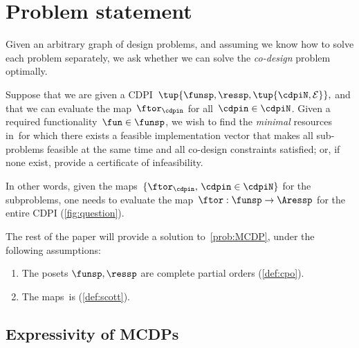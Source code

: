 

\section{Problem statement}
\label{sec:Optimization}

Given an arbitrary graph of design problems, and assuming we know
how to solve each problem separately, we ask whether we can solve
the \emph{co-design} problem optimally.







\begin{problem}
  \label{prob:MCDP}Suppose that we are given a CDPI~$\tup{ \funsp,\ressp,\tup{ \cdpiN,\mathcal{E}} } ,$
  and that we can evaluate the map~$\ftor_{\cdpin}$ for all~$\cdpin\in\cdpiN$.
  Given a required functionality~$\fun\in\funsp$, we wish to find
  the \emph{minimal} resources in~\ressp for which there exists
  a feasible implementation vector that makes all sub-problems feasible
  at the same time and all co-design constraints satisfied; or, if
  none exist, provide a certificate of infeasibility.
\end{problem}
In other words, given the maps~$\{\ftor_{\cdpin},\,\cdpin\in\cdpiN\}$
for the subproblems, one needs to evaluate the map~$\ftor:\funsp\rightarrow\Aressp$
for the entire CDPI (\cref{fig:question}).


The rest of the paper will provide a solution to~\cref{prob:MCDP},
under the following assumptions:

\begin{enumerate}
  \item The posets $\funsp,\ressp$ are complete partial orders (\cref{def:cpo}).
  \item The maps~\ftor is \scottcontinuous (\cref{def:scott}).
\end{enumerate}

\subsection{Expressivity of MCDPs}

